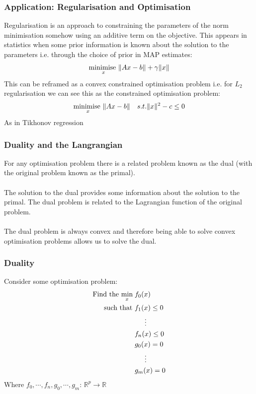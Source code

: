 \documentclass{beamer}
\DeclarePairedDelimiter\norm{\lVert}{\rVert}
\def\rnum{\mathbb{R}}
\begin{document}
\begin{frame}
    \frametitle{Application: Regularisation and Optimisation}
    Regularisation is an approach to constraining the parameters of the norm
    minimisation somehow using an additive term on the objective. This appears
    in statistics when some prior information is known about the solution to the
    parameters i.e. through the choice of prior in MAP estimates:
    \begin{align*}
        \underset{x}{\text{minimise }} \norm{Ax - b}+ \gamma\norm{x}
    \end{align*}
    This can be reframed as a convex constrained optimisation problem i.e. for
    $L_{2}$ regularisation we can see this as the constrained optimisation
    problem:
    \begin{align*}
        &\underset{x}{\text{minimise }} \norm{Ax - b}
        &s.t. \norm{x}^{2} - c \leq 0
    \end{align*}
    As in Tikhonov regression
\end{frame}

\begin{frame}
    \frametitle{Duality and the Langrangian}
    For any optimisation problem there is a related problem known as the dual
    (with the original problem known as the primal).
    \\~\\
    The solution to the dual provides some information about the solution to the
    primal. The dual problem is related to the Lagrangian function of the
    original problem.
    \\~\\
    The dual problem is always convex and therefore being able to solve
    convex optimisation problems allows us to solve the dual.
\end{frame}

\begin{frame}
    \frametitle{Duality}
    Consider some optimisation problem:
    {\footnotesize
    \begin{align*}
        \text{Find the }\underset{x}{\text{min}}\; &f_{0}(x) \\
        \text{  such that }&f_{1}(x) \leq 0 \\
        & \hspace{5mm} \vdots \\
        &f_{n}(x) \leq 0 \\
        &g_{0}(x) = 0 \\
        &\hspace{5mm} \vdots \\
        &g_{m}(x) = 0
    \end{align*}}
    Where $f_0,\cdots, f_n, g_0, \cdots, g_m:\, \rnum^{p} \rightarrow \rnum$
\end{frame}
\end{document}
